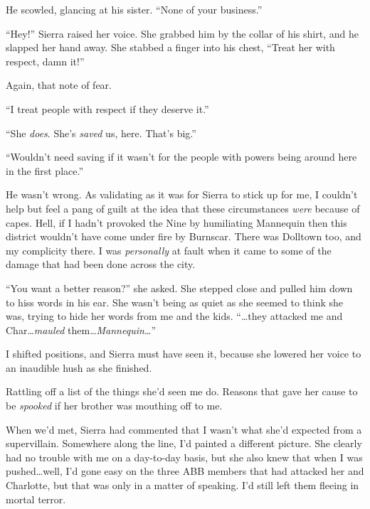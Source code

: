 He scowled, glancing at his sister.  ``None of your business.''



``Hey!''  Sierra raised her voice.  She grabbed him by the collar of his shirt, and he slapped her hand away.  She stabbed a finger into his chest, ``Treat her with respect, damn it!''



Again, that note of fear.



``I treat people with respect if they deserve it.''



``She \emph{does}.  She's \emph{saved} us, here.  That's big.''



``Wouldn't need saving if it wasn't for the people with powers being around here in the first place.''



He wasn't wrong.  As validating as it was for Sierra to stick up for me, I couldn't help but feel a pang of guilt at the idea that these circumstances \emph{were} because of capes.  Hell, if I hadn't provoked the Nine by humiliating Mannequin then this district wouldn't have come under fire by Burnscar.  There was Dolltown too, and my complicity there.  I was \emph{personally} at fault when it came to some of the damage that had been done across the city.



``You want a better reason?'' she asked.  She stepped close and pulled him down to hiss words in his ear.  She wasn't being as quiet as she seemed to think she was, trying to hide her words from me and the kids.  ``\ldots{}they attacked me and Char\ldots \emph{mauled} them\ldots  \emph{Mannequin\ldots}''



I shifted positions, and Sierra must have seen it, because she lowered her voice to an inaudible hush as she finished.



Rattling off a list of the things she'd seen me do.  Reasons that gave her cause to be \emph{spooked} if her brother was mouthing off to me.



When we'd met, Sierra had commented that I wasn't what she'd expected from a supervillain.  Somewhere along the line, I'd painted a different picture.  She clearly had no trouble with me on a day-to-day basis, but she also knew that when I was pushed\ldots well, I'd gone easy on the three ABB members that had attacked her and Charlotte, but that was only in a matter of speaking.  I'd still left them fleeing in mortal terror.



